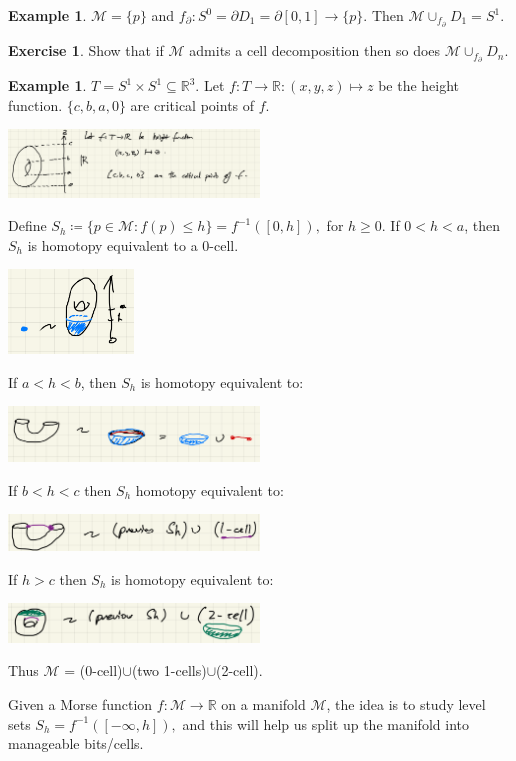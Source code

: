 \documentclass[10pt]{article}
\theoremstyle{plain}
\theoremstyle{definition}
\newtheorem{exmp}[thm]{Example} %
\newtheorem{exercise}[thm]{Exercise}
\newcommand{\Real}{\mathbb{R}}
\newcommand{\man}{\mathcal{M}}
\newcommand{\inter}{\left[0,1\right]}
\begin{document}
\begin{exmp}
     $\man = \{p\}$ and $f_\partial : S^0 = \partial D_1 = \partial \inter \to \{p\}.$ Then $\man \cup_{f_\partial}D_1 = S^1$.
\end{exmp}

\begin{exercise}
    Show that if $\man$ admits a cell decomposition then so does $\man \cup_{f_\partial} D_n$.
\end{exercise}

\begin{exmp}
    $T = S^1 \times S^1 \subseteq \Real^3$. Let $f:T\to \Real:(x,y,z)\mapsto z$ be the height function. $\{c,b,a,0\}$ are critical points of $f$.
    \begin{center}
        \includegraphics[width=0.5\textwidth]{TorusCellDecomposition.png}
    \end{center}
    Define $S_h \coloneqq \{p\in\man : f(p) \leq h\} = f^{-1}([0,h]), $ for $h\geq 0$. If $0<h<a$, then $S_h$ is homotopy equivalent to a 0-cell.
    \begin{center}
        \includegraphics[width=0.25\textwidth]{MorseTorusTrivialHomotopy.png}
    \end{center}
    If $a<h<b$, then $S_h$ is homotopy equivalent to:    
    \begin{center}
        \includegraphics[width=0.5\textwidth]{MorseTorusHomotopyOneCell.png}
    \end{center}
    If $b<h<c$ then $S_h$ homotopy equivalent to:
    \begin{center}
        \includegraphics[width = 0.5\textwidth]{MorseTorusHomotopyOneCellWithZeroCell.png}
    \end{center}
    If $h>c$ then $S_h$ is homotopy equivalent to:
    \begin{center}
        \includegraphics[width=0.5\textwidth]{MorseTorusHomotopyFullTorus.png}
    \end{center}
    Thus $\man$ = (0-cell)$\cup$(two 1-cells)$\cup$(2-cell).
\end{exmp}
Given a Morse function $f : \man \to \Real$ on a manifold $\man$, the idea is to study level sets $S_h = f^{-1}([-\infty,h]),$ and this will help us split up the manifold into manageable bits/cells.
\end{document}
